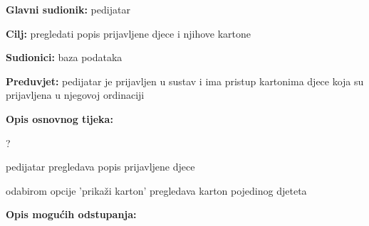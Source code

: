      
                    \noindent {}
					\begin{packed_item}
	
						\item \textbf{Glavni sudionik: }pedijatar
						\item  \textbf{Cilj:} pregledati popis prijavljene djece i njihove kartone
						\item  \textbf{Sudionici:} baza podataka
						\item  \textbf{Preduvjet:} pedijatar je prijavljen u sustav i ima pristup kartonima djece koja su prijavljena u njegovoj ordinaciji
						\item  \textbf{Opis osnovnog tijeka:}
						
						\item[] \begin{packed_enum}
	
							\item ?
							\item pedijatar pregledava popis prijavljene djece
							\item odabirom opcije 'prikaži karton' pregledava karton pojedinog djeteta

						\end{packed_enum}
						
						\item  \textbf{Opis mogućih odstupanja:}
						
						\item[] \begin{packed_item}
	
							\item[2.a] 
							\item[] \begin{packed_enum}
								
								\item 
								\item 
							\end{packed_enum}
							
						\end{packed_item}
					\end{packed_item}


